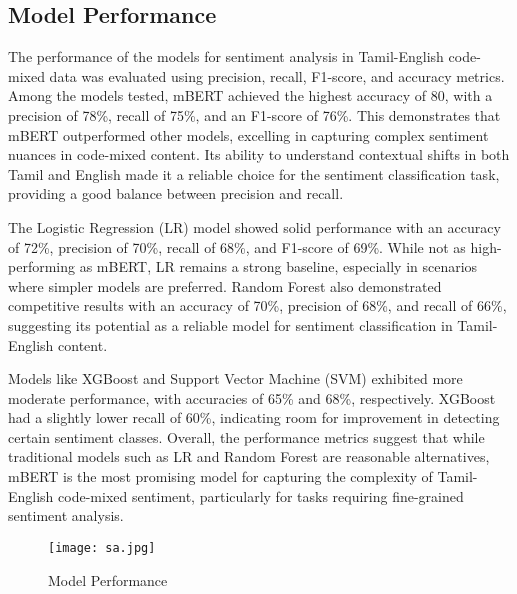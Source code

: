 \documentclass[11pt]{article}
\begin{document}
\subsection{Model Performance}
The performance of the models for sentiment analysis in Tamil-English code-mixed data was evaluated using precision, recall, F1-score, and accuracy metrics. Among the models tested, mBERT achieved the highest accuracy of 80, with a precision of 78\%, recall of 75\%, and an F1-score of 76\%. This demonstrates that mBERT outperformed other models, excelling in capturing complex sentiment nuances in code-mixed content. Its ability to understand contextual shifts in both Tamil and English made it a reliable choice for the sentiment classification task, providing a good balance between precision and recall.

The Logistic Regression (LR) model showed solid performance with an accuracy of 72\%, precision of 70\%, recall of 68\%, and F1-score of 69\%. While not as high-performing as mBERT, LR remains a strong baseline, especially in scenarios where simpler models are preferred. Random Forest also demonstrated competitive results with an accuracy of 70\%, precision of 68\%, and recall of 66\%, suggesting its potential as a reliable model for sentiment classification in Tamil-English content.

Models like XGBoost and Support Vector Machine (SVM) exhibited more moderate performance, with accuracies of 65\% and 68\%, respectively. XGBoost had a slightly lower recall of 60\%, indicating room for improvement in detecting certain sentiment classes. Overall, the performance metrics suggest that while traditional models such as LR and Random Forest are reasonable alternatives, mBERT is the most promising model for capturing the complexity of Tamil-English code-mixed sentiment, particularly for tasks requiring fine-grained sentiment analysis.


\begin{figure}[t]
  \texttt{[image: sa.jpg]}
  \caption{Model Performance}
  \label{fig:experiments}
\end{figure}
\end{document}
